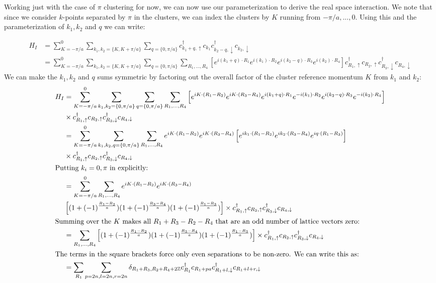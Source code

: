 \documentclass[12pt]{article}
\numberwithin{equation}{section}
\begin{document}
Working just with the case of $\pi$ clustering for now, we can now use our parameterization to derive the real space interaction. We note that since we consider $k$-points separated by $\pi$ in the clusters, we can index the clusters by $K$ running from $-\pi/a,..., 0$. Using this and the parameterization of $k_1,k_2$ and $q$ we can write:

\begin{align}
    H_I&=\sum_{K=-\pi/a}^{0}\sum_{k_1,k_2=\{K,K+\pi/a\}}\sum_{q=\{0,\pi/a\}}
    c^\dagger_{k_1+q,\uparrow}c_{k_1}c^\dagger_{k_2-q,\downarrow}c_{k_2,\downarrow}\\
    &=\sum_{K=-\pi/a}^0\sum_{k_1,k_2=\{K,K+\pi/a\}}\sum_{q=\{0,\pi/a\}}
    \sum_{R_1,...,R_4}
    \left[
        e^{i(k_1+q)\cdot R_1}e^{i(k_1)\cdot R_2}e^{i(k_2-q)\cdot R_3}e^{i(k_2)\cdot R_4}
    \right]
    c^\dagger_{R_1,\uparrow}c_{R_2,\uparrow}c^\dagger_{R_3,\downarrow}c_{R_4,\downarrow}
\end{align}
We can make the $k_1,k_2$ and $q$ sums symmetric by factoring out the overall factor of the cluster reference momentum $K$ from $k_1$ and $k_2$:
\begin{align}
    H_I&=\sum_{K=-\pi/a}^0\sum_{k_1,k_2=\{0,\pi/a\}}\sum_{q=\{0,\pi/a\}}
    \sum_{R_1,...,R_4}
    \left[
        e^{iK\cdot (R_1-R_2)}e^{iK\cdot (R_3-R_4)}e^{i(k_1+q)\cdot R_1}e^{-i(k_1)\cdot R_2}e^{i(k_2-q)\cdot R_3}e^{-i(k_2)\cdot R_4}
    \right]\\
    &\times c^\dagger_{R_1,\uparrow}c_{R_2,\uparrow}c^\dagger_{R_3,\downarrow}c_{R_4,\downarrow}\\
    &=\sum_{K=-\pi/a}^0\sum_{k_1,k_2,q=\{0,\pi/a\}}
    \sum_{R_1,...,R_4}
    e^{iK\cdot (R_1-R_2)}e^{iK\cdot (R_3-R_4)}
    \left[
        e^{i k_1\cdot (R_1-R_2)}e^{i k_2\cdot (R_3-R_4)}e^{i q\cdot (R_1-R_3)}
    \right]\\
    &\times c^\dagger_{R_1,\uparrow}c_{R_2,\uparrow}c^\dagger_{R_3,\downarrow}c_{R_4,\downarrow}\\
    \shortintertext{Putting $k_i=0,\pi$ in explicitly:}
    &=\sum_{K=-\pi/a}^0
    \sum_{R_1,...,R_4}
    e^{iK\cdot (R_1-R_2)}e^{iK\cdot (R_3-R_4)}\\
    &\left[
    (1+(-1)^{\frac{R_1-R_2}{a}})(1+(-1)^{\frac{R_3-R_4}{a}})(1+(-1)^{\frac{R_1-R_3}{a}})
    \right]
    \times c^\dagger_{R_1,\uparrow}c_{R_2,\uparrow}c^\dagger_{R_3,\downarrow}c_{R_4,\downarrow}\\
    \shortintertext{Summing over the $K$ makes all $R_1+R_3-R_2-R_4$ that are an odd number of lattice vectors zero:}
    &=\sum_{R_1,...,R_4}
    \left[
    (1+(-1)^{\frac{R_1-R_2}{a}})(1+(-1)^{\frac{R_3-R_4}{a}})(1+(-1)^{\frac{R_1-R_3}{a}})
    \right]
    \times c^\dagger_{R_1,\uparrow}c_{R_2,\uparrow}c^\dagger_{R_3,\downarrow}c_{R_4,\downarrow}\\
    \shortintertext{The terms in the square brackets force only even separations to be non-zero. We can write this as:}
    &=
    \sum_{R_1}\sum_{p=2n,l=2n,r=2n}
    \delta_{R_1+R_3,R_2+R_4+2\mathbb{Z}}
    c^\dagger_{R_1}c_{R_1+p a}c^\dagger_{R_1+l,\downarrow}c_{R_1+l+r,\downarrow}
\end{align}
\end{document}
